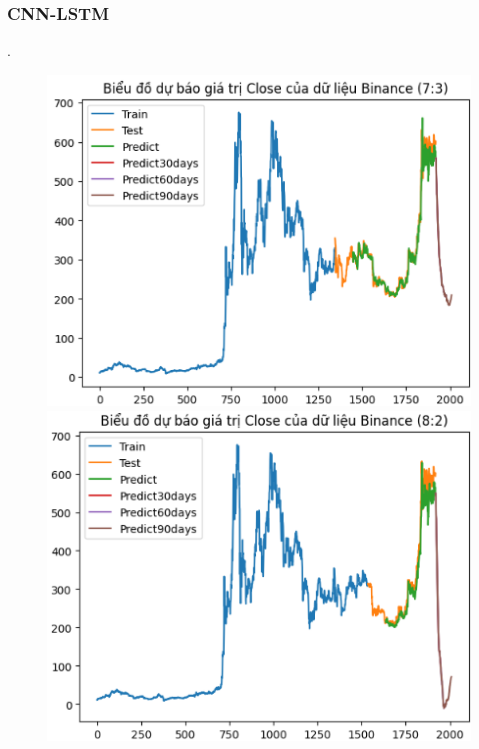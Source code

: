 \documentclass[conference]{IEEEtran}
\begin{document}
\subsubsection{CNN-LSTM}.
\begin{figure}[H]
    \centering
    \begin{minipage}{0.15\textwidth}
    \centering
    \includegraphics[width=1\textwidth]{Figure/BNB73.png}
    \end{minipage}
    \hfill
    \begin{minipage}{0.15\textwidth}
    \centering
    \includegraphics[width=1\textwidth]{Figure/BNB82.png}
    \end{minipage}

\end{figure}
\end{document}

